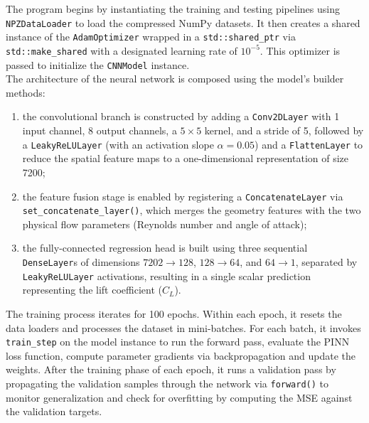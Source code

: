 The program begins by instantiating the training and testing pipelines using \texttt{NPZDataLoader} to load the compressed NumPy datasets. It then creates a shared instance of the \texttt{AdamOptimizer} wrapped in a \texttt{std::shared\_ptr} via \texttt{std::make\_shared} with a designated learning rate of $10^{-5}$. This optimizer is passed to initialize the \texttt{CNNModel} instance.\\

The architecture of the neural network is composed using the model's builder methods:
\begin{enumerate}[itemsep=2ex, topsep=2ex]
    \item the convolutional branch is constructed by adding a \texttt{Conv2DLayer} with 1 input channel, 8 output channels, a $5 \times 5$ kernel, and a stride of 5, followed by a \texttt{LeakyReLULayer} (with an activation slope $\alpha = 0.05$) and a \texttt{FlattenLayer} to reduce the spatial feature maps to a one-dimensional representation of size 7200;
    \item the feature fusion stage is enabled by registering a \texttt{ConcatenateLayer} via \texttt{set\_concatenate\_layer()}, which merges the geometry features with the two physical flow parameters (Reynolds number and angle of attack);
    \item the fully-connected regression head is built using three sequential \texttt{DenseLayer}s of dimensions $7202 \to 128$, $128 \to 64$, and $64 \to 1$, separated by \texttt{LeakyReLULayer} activations, resulting in a single scalar prediction representing the lift coefficient ($C_L$).
\end{enumerate}
\vspace{2ex}
The training process iterates for 100 epochs. Within each epoch, it resets the data loaders and processes the dataset in mini-batches. For each batch, it invokes \texttt{train\_step} on the model instance to run the forward pass, evaluate the PINN loss function, compute parameter gradients via backpropagation and update the weights. After the training phase of each epoch, it runs a validation pass by propagating the validation samples through the network via \texttt{forward()} to monitor generalization and check for overfitting by computing the MSE against the validation targets.


